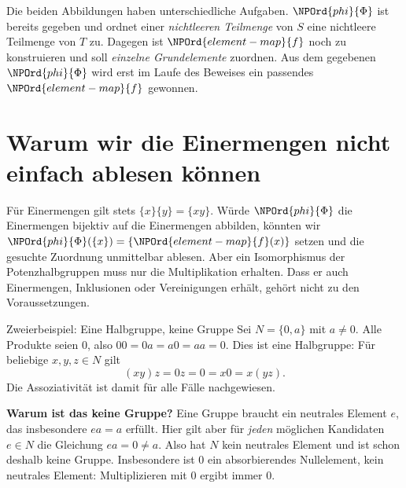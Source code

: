 Die beiden Abbildungen haben unterschiedliche Aufgaben. \(\NPOrd{phi}{\Phi}\) ist
bereits gegeben und ordnet einer \emph{nichtleeren Teilmenge} von \(S\)
eine nichtleere Teilmenge von \(T\) zu. Dagegen ist \(\NPOrd{element-map}{f}\) noch zu
konstruieren und soll \emph{einzelne Grundelemente} zuordnen.
Aus dem gegebenen \(\NPOrd{phi}{\Phi}\) wird erst im Laufe des Beweises ein passendes
\(\NPOrd{element-map}{f}\) gewonnen.

\section*{Warum wir die Einermengen nicht einfach ablesen können}

Für Einermengen gilt stets \(\{x\}\{y\}=\{xy\}\). Würde \(\NPOrd{phi}{\Phi}\)
die Einermengen bijektiv auf die Einermengen abbilden, könnten wir
\(\NPOrd{phi}{\Phi}(\{x\})=\{\NPOrd{element-map}{f}(x)\}\) setzen und die gesuchte Zuordnung unmittelbar
ablesen. Aber ein Isomorphismus der Potenzhalbgruppen muss nur die
Multiplikation erhalten. Dass er auch Einermengen, Inklusionen oder
Vereinigungen erhält, gehört nicht zu den Voraussetzungen.

\begin{NPReadingExample}{Zweierbeispiel: Eine Halbgruppe, keine Gruppe}
Sei \(N=\{0,a\}\) mit \(a\ne0\). Alle Produkte seien \(0\), also
\(00=0a=a0=aa=0\). Dies ist eine Halbgruppe: Für beliebige
\(x,y,z\in N\) gilt
\[
 (xy)z=0z=0=x0=x(yz).
\]
Die Assoziativität ist damit für alle Fälle nachgewiesen.

\medskip\noindent\textbf{Warum ist das keine Gruppe?}
Eine Gruppe braucht ein neutrales Element \(e\), das insbesondere
\(ea=a\) erfüllt. Hier gilt aber für \emph{jeden} möglichen Kandidaten
\(e\in N\) die Gleichung \(ea=0\ne a\). Also hat \(N\) kein
neutrales Element und ist schon deshalb keine Gruppe.
Insbesondere ist \(0\) ein absorbierendes Nullelement, kein neutrales
Element: Multiplizieren mit \(0\) ergibt immer \(0\).
\end{NPReadingExample}

